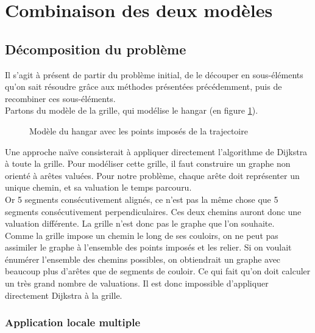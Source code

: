 \section{Combinaison des deux modèles}
\subsection{Décomposition du problème}
Il s'agit à présent de partir du problème initial, de le découper en sous-éléments qu'on sait résoudre grâce aux méthodes présentées précédemment, puis de recombiner ces sous-éléments.\\
Partons du modèle de la grille, qui modélise le hangar (en figure \ref{fig:grille1}).\\
\begin{figure}[h]
	\centering
	
	\caption{Modèle du hangar avec les points imposés de la trajectoire}
	\label{fig:grille1}
\end{figure}
Une approche naïve consisterait à appliquer directement l'algorithme de Dijkstra à toute la grille. Pour modéliser cette grille, il faut construire un graphe non orienté à arêtes valuées. Pour notre problème, chaque arête doit représenter un unique chemin, et sa valuation le temps parcouru.\\
Or 5 segments consécutivement alignés, ce n'est pas la même chose que 5 segments consécutivement perpendiculaires. Ces deux chemins auront donc une valuation différente. La grille n'est donc pas le graphe que l'on souhaite.\\
Comme la grille impose un chemin le long de ses couloirs, on ne peut pas assimiler le graphe à l'ensemble des points imposés et les relier. Si on voulait énumérer l'ensemble des chemins possibles, on obtiendrait un graphe avec beaucoup plus d'arêtes que de segments de couloir. Ce qui fait qu'on doit calculer un très grand nombre de valuations. Il est donc impossible d'appliquer directement Dijkstra à la grille.

\subsubsection{Application locale multiple}
